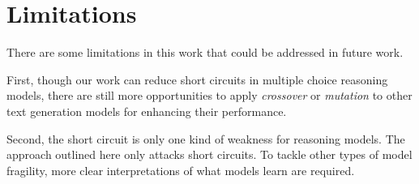 \section*{Limitations}
There are some limitations in this work that could be addressed in future work. 

First, though our work can reduce short circuits in multiple choice reasoning models, 
there are still more opportunities to apply \textit{crossover} or \textit{mutation} to other 
text generation models for enhancing their performance. 

Second, the short circuit is only one kind of weakness for reasoning models. 
The approach outlined here only attacks short circuits. To tackle other types of
model fragility, more clear interpretations of what models learn are required. 
